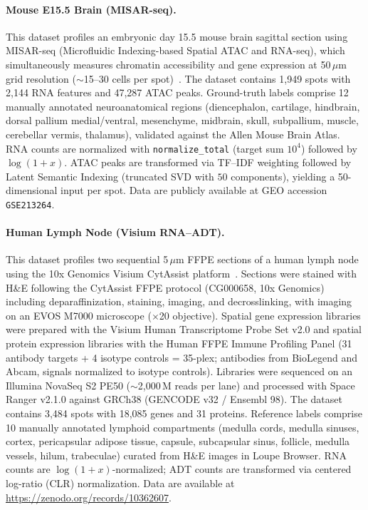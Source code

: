 \documentclass{article}
\theoremstyle{plain}
\theoremstyle{definition}
\begin{document}
\paragraph{Mouse E15.5 Brain (MISAR-seq).}
This dataset profiles an embryonic day 15.5 mouse brain sagittal section using MISAR-seq (Microfluidic Indexing-based Spatial ATAC and RNA-seq), which simultaneously measures chromatin accessibility and gene expression at 50\,$\mu$m grid resolution ($\sim$15--30 cells per spot)~\cite{zuo2023misar}. The dataset contains 1{,}949 spots with 2{,}144 RNA features and 47{,}287 ATAC peaks. Ground-truth labels comprise 12 manually annotated neuroanatomical regions (diencephalon, cartilage, hindbrain, dorsal pallium medial/ventral, mesenchyme, midbrain, skull, subpallium, muscle, cerebellar vermis, thalamus), validated against the Allen Mouse Brain Atlas. RNA counts are normalized with \texttt{normalize\_total} (target sum $10^4$) followed by $\log(1+x)$. ATAC peaks are transformed via TF--IDF weighting followed by Latent Semantic Indexing (truncated SVD with $50$ components), yielding a 50-dimensional input per spot. Data are publicly available at GEO accession \texttt{GSE213264}.

\paragraph{Human Lymph Node (Visium RNA--ADT).}
This dataset profiles two sequential 5\,$\mu$m FFPE sections of a human lymph node using the 10x Genomics Visium CytAssist platform~\cite{long2024spatialglue}. Sections were stained with H\&E following the CytAssist FFPE protocol (CG000658, 10x Genomics) including deparaffinization, staining, imaging, and decrosslinking, with imaging on an EVOS M7000 microscope ($\times$20 objective). Spatial gene expression libraries were prepared with the Visium Human Transcriptome Probe Set v2.0 and spatial protein expression libraries with the Human FFPE Immune Profiling Panel (31 antibody targets + 4 isotype controls = 35-plex; antibodies from BioLegend and Abcam, signals normalized to isotype controls). Libraries were sequenced on an Illumina NovaSeq S2 PE50 ($\sim$2{,}000\,M reads per lane) and processed with Space Ranger v2.1.0 against GRCh38 (GENCODE v32 / Ensembl 98). The dataset contains 3{,}484 spots with 18{,}085 genes and 31 proteins. Reference labels comprise 10 manually annotated lymphoid compartments (medulla cords, medulla sinuses, cortex, pericapsular adipose tissue, capsule, subcapsular sinus, follicle, medulla vessels, hilum, trabeculae) curated from H\&E images in Loupe Browser. RNA counts are $\log(1+x)$-normalized; ADT counts are transformed via centered log-ratio (CLR) normalization. Data are available at \url{https://zenodo.org/records/10362607}.
\end{document}
